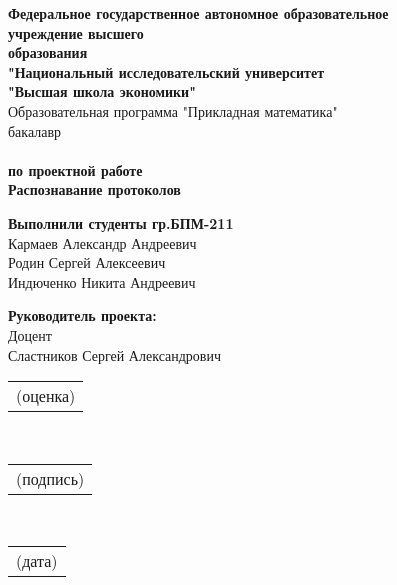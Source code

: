 \documentclass[a4paper, 12pt]{report}
\begin{document}
\thispagestyle{empty}

\begin{center}
    \textbf{Федеральное государственное автономное образовательное \\
    учреждение высшего \\
    образования\\
    "Национальный исследовательский университет \\
    "Высшая школа экономики" \\}
    \bigskip
    \bigskip
    \bigskip
    \bigskip
    Образовательная программа "Прикладная математика" \\
    бакалавр \\
    \bigskip
    \bigskip
    \bigskip
    \bigskip
    \textbf{ \\}
    \normalfont \textbf{по проектной работе \\ }
    \bigskip
    \bigskip
    \large \textbf{Распознавание протоколов}
    \bigskip
    \bigskip
    \bigskip
    \bigskip
    \bigskip
    \bigskip
\end{center}

\begin{flushright}
    \textbf{Выполнили студенты гр.БПМ-211}\\
    \bigskip
    Кармаев Александр Андреевич\\
    Родин Сергей Алексеевич \\
    Индюченко Никита Андреевич\\
    \bigskip
\end{flushright}

\begin{flushleft}
    \textbf{Руководитель проекта:}\\
    \bigskip
    Доцент \\
    \bigskip
    Сластников Сергей Александрович \\
    \begin{tabular}{c}
    \\ \hline
    (оценка)
    \end{tabular}\ \ \ 
    \begin{tabular}{c}
    \\ \hline
    (подпись)
    \end{tabular}\\
    \begin{tabular}{c}
    \\ \hline
    (дата)
    \end{tabular}
\end{flushleft}
\end{document}
